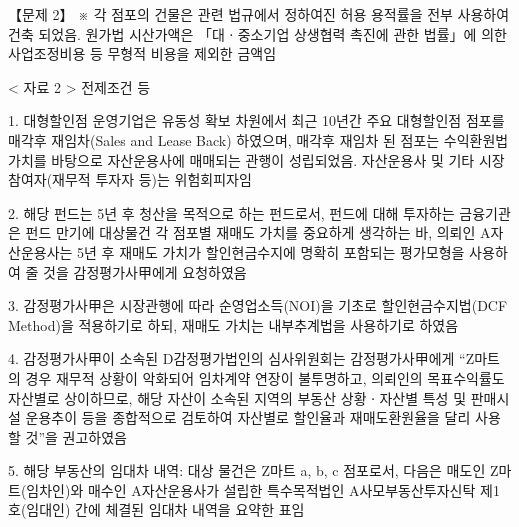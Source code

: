 \begin{longquestion}{【문제 2】}
※ 각 점포의 건물은 관련 법규에서 정하여진 허용 용적률을 전부 사용하여 건축 되었음. 원가법 시산가액은 「대ㆍ중소기업 상생협력 촉진에 관한 법률」에 의한 사업조정비용 등 무형적 비용을 제외한 금액임 \par
< 자료 2 > 전제조건 등 \par
1. 대형할인점 운영기업은 유동성 확보 차원에서 최근 10년간 주요 대형할인점 점포를 매각후 재임차(Sales and Lease Back) 하였으며, 매각후 재임차 된 점포는 수익환원법 가치를 바탕으로 자산운용사에 매매되는 관행이 성립되었음. 자산운용사 및 기타 시장참여자(재무적 투자자 등)는 위험회피자임 \par
2. 해당 펀드는 5년 후 청산을 목적으로 하는 펀드로서, 펀드에 대해 투자하는 금융기관은 펀드 만기에 대상물건 각 점포별 재매도 가치를 중요하게 생각하는 바, 의뢰인 A자산운용사는 5년 후 재매도 가치가 할인현금수지에 명확히 포함되는 평가모형을 사용하여 줄 것을 감정평가사甲에게 요청하였음 \par
3. 감정평가사甲은 시장관행에 따라 순영업소득(NOI)을 기초로 할인현금수지법(DCF Method)을 적용하기로 하되, 재매도 가치는 내부추계법을 사용하기로 하였음 \par
4. 감정평가사甲이 소속된 D감정평가법인의 심사위원회는 감정평가사甲에게 “Z마트의 경우 재무적 상황이 악화되어 임차계약 연장이 불투명하고, 의뢰인의 목표수익률도 자산별로 상이하므로, 해당 자산이 소속된 지역의 부동산 상황ㆍ자산별 특성 및 판매시설 운용추이 등을 종합적으로 검토하여 자산별로 할인율과 재매도환원율을 달리 사용할 것”을 권고하였음 \par
5. 해당 부동산의 임대차 내역: 대상 물건은 Z마트 a, b, c 점포로서, 다음은 매도인 Z마트(임차인)와 매수인 A자산운용사가 설립한 특수목적법인 A사모부동산투자신탁 제1호(임대인) 간에 체결된 임대차 내역을 요약한 표임 \par
{\small\centering\renewcommand{\arraystretch}{3.5}
\par}


\end{longquestion}
